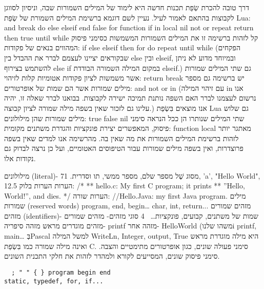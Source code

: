       דרך טובה להכרת שְׂפַת תכנות חדשה היא לימוד של המילים השמורות שבה, וניסיון
      לסווגן לקבוצות בהתאם לאמור לעיל. נעיין לשם דוגמא ברשימת המילים השמורת של
      שְׂפַת Lua: and break do else elseif end false for function if in local nil
      not or repeat return then true until while
      קל לזהות ברשימה זו את המילים השמורות המשמשות כסימני פיסוק המהווים בנאים של פקודות:
      if else elseif then for do repeat until while
      (הפקחים שבקוראים יציינו לעצמם לברר את ההבדל בין else ובין elseif, ובמיוחד מדוע לא ניתן להשתמש בצירוף else if במקום המילה השמורה הבודדת elseif.)
      גם שתי המילים שמורות אשר משמשות לציון פקודות אטומיות קלות לזיהוי:
      return break
      יש ברשימה גם מספר מילים שמורות אשר הם שמות של אופרטורים:
      and not or in
      (עם זיהוי המילה in אנו נרשום לעצמנו לברר האם השפה נותנת תמיכה ישירה לקבוצות. בבואנו לברר שאלה זו, יהיה עלינו גם לזכור שאין בשפה מילה שמורה לציון קבוצה.)
      אנו מוצאים בִּשְׂפַת Lua גם שלוש מילים שמורות שהן מילולונים:
      true false nil
      שתי המילים שנותרו הן ככל הנראה סימני פיסוק, המאפשרים יצירת פונקציות והגדרת משתנים מקומית:
      function local
      מאתגר יותר לזהות ברשימת המילים השמורות את מה שאין בה. מהרשימה אנו למדים שאין בשפה פרוצדרות, ואין בשפה מילים שמורות עבור הטיפוסים האטומיים, ועל כן נרצה לבדוק גם נקודות אלו.

      מילולונים (literal)- מסוג שֶׁל מספר שלם, מספר ממשי, תו וסדרית.
      71, 'a', "Hello World", 12.5
      הערות
      הערות בלוק:
      /*
      ** hello.c: My first C program; it prints
      ** ”Hello, World!”, and dies.
      */
      הערות שורה:
      //Hello.Java: my first Java program.
      מילים שמורות (reserved words)
      program, end, begin…
      char, int, return... מזהים שמורים
      מזהים (identifiers)- שמות של משתנים, קבועים, פונקציות…
~4 סוגי מזהים-
      מזהים שמורים
      מזהים מוגדרים מראש
      מזהה סיפריה- printf
      מזהה אחר- HelloWorld (משהו שלנו^^)
      printf, main…
      בְּPascal למשל המילה WriteLn, Integer, output, True
      היא מילה מוגדרת מראש ואינה מילה שמורה כמו בִּשְׂפַת C.
      סימני פעולה שונים, כגון אופרטורים מתימטיים והצבה.
      סימני פיסוק שונים, המסייעים לקורא ולמהדר לזהות את חלקי התכנית השונים.
      \begin{verbatim}
  ; " " { } program begin end
static, typedef, for, if...
      \end{verbatim}
